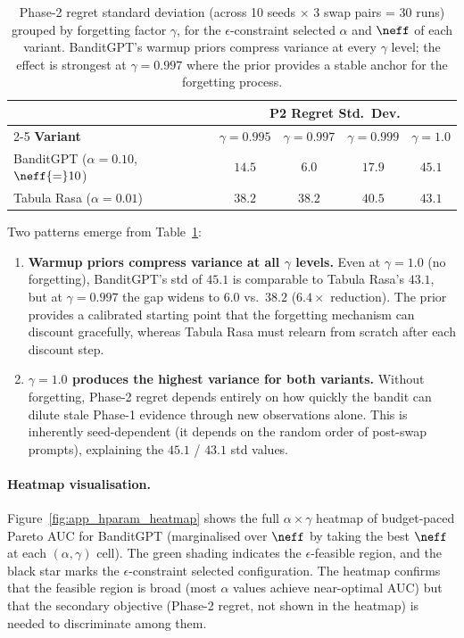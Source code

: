 \begin{table}[h]
\centering
\small
\caption{%
  Phase-2 regret standard deviation (across 10 seeds $\times$ 3 swap
  pairs = 30 runs) grouped by forgetting factor $\gamma$,
  for the $\epsilon$-constraint selected $\alpha$ and $\neff$ of
  each variant.
  BanditGPT's warmup priors compress variance at every $\gamma$ level;
  the effect is strongest at $\gamma{=}0.997$ where the prior
  provides a stable anchor for the forgetting process.%
}
\label{tab:app_per_seed_variance}
\begin{tabular}{@{}lcccc@{}}
\toprule
& \multicolumn{4}{c}{\textbf{P2 Regret Std.\ Dev.}} \\
\cmidrule(l){2-5}
\textbf{Variant}
  & $\gamma{=}0.995$ & $\gamma{=}0.997$
  & $\gamma{=}0.999$ & $\gamma{=}1.0$ \\
\midrule
BanditGPT ($\alpha{=}0.10$, $\neff{=}10$)
  & $14.5$ & $\mathbf{6.0}$ & $17.9$ & $45.1$ \\
Tabula Rasa ($\alpha{=}0.01$)
  & $38.2$ & $38.2$ & $40.5$ & $43.1$ \\
\bottomrule
\end{tabular}
\end{table}

\noindent
Two patterns emerge from Table~\ref{tab:app_per_seed_variance}:
\begin{enumerate}[nosep,leftmargin=*]
  \item \textbf{Warmup priors compress variance at all $\gamma$
    levels.}
    Even at $\gamma{=}1.0$ (no forgetting), BanditGPT's std of $45.1$
    is comparable to Tabula Rasa's $43.1$, but at
    $\gamma{=}0.997$ the gap widens to $6.0$ vs.\ $38.2$
    ($6.4\times$ reduction).
    The prior provides a calibrated starting point that the
    forgetting mechanism can discount gracefully, whereas Tabula Rasa
    must relearn from scratch after each discount step.

  \item \textbf{$\gamma{=}1.0$ produces the highest variance for
    both variants.}
    Without forgetting, Phase-2 regret depends entirely on how
    quickly the bandit can dilute stale Phase-1 evidence through
    new observations alone.
    This is inherently seed-dependent (it depends on the random
    order of post-swap prompts), explaining the $45.1$ / $43.1$
    std values.
\end{enumerate}

\paragraph{Heatmap visualisation.}
Figure~\ref{fig:app_hparam_heatmap} shows the full
$\alpha \times \gamma$ heatmap of budget-paced Pareto AUC for
BanditGPT (marginalised over $\neff$ by taking the best $\neff$
at each $(\alpha, \gamma)$ cell).
The green shading indicates the $\epsilon$-feasible region, and
the black star marks the $\epsilon$-constraint selected
configuration.
The heatmap confirms that the feasible region is broad (most
$\alpha$ values achieve near-optimal AUC) but that the secondary
objective (Phase-2 regret, not shown in the heatmap) is needed to
discriminate among them.

